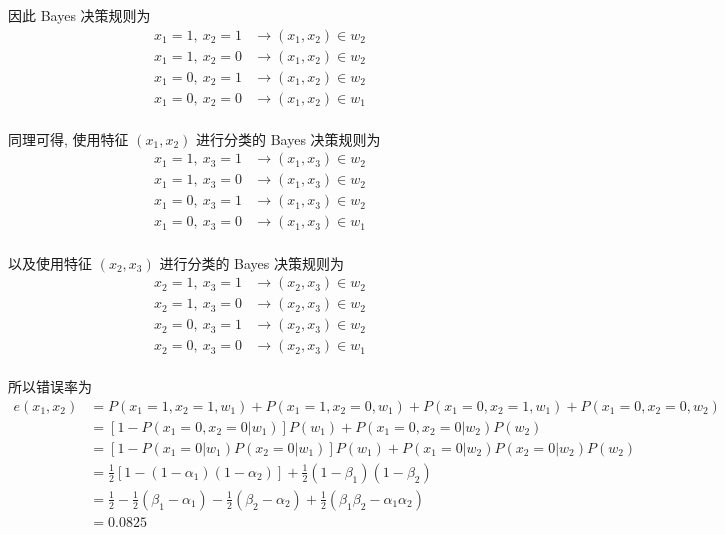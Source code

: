 \documentclass{article}
\begin{document}
因此 Bayes 决策规则为
\begin{equation}
  \begin{aligned}
    x_1=1,~x_2=1&\to (x_1,x_2)\in w_2\\
    x_1=1,~x_2=0&\to (x_1,x_2)\in w_2\\
    x_1=0,~x_2=1&\to (x_1,x_2)\in w_2\\
    x_1=0,~x_2=0&\to (x_1,x_2)\in w_1\\
  \end{aligned}
\end{equation}

同理可得, 使用特征 $(x_1,x_2)$ 进行分类的 Bayes 决策规则为
\begin{equation}
  \begin{aligned}
    x_1=1,~x_3=1&\to (x_1,x_3)\in w_2\\
    x_1=1,~x_3=0&\to (x_1,x_3)\in w_2\\
    x_1=0,~x_3=1&\to (x_1,x_3)\in w_2\\
    x_1=0,~x_3=0&\to (x_1,x_3)\in w_1\\
  \end{aligned}
\end{equation}

以及使用特征 $(x_2,x_3)$ 进行分类的 Bayes 决策规则为
\begin{equation}
  \begin{aligned}
    x_2=1,~x_3=1&\to (x_2,x_3)\in w_2\\
    x_2=1,~x_3=0&\to (x_2,x_3)\in w_2\\
    x_2=0,~x_3=1&\to (x_2,x_3)\in w_2\\
    x_2=0,~x_3=0&\to (x_2,x_3)\in w_1\\
  \end{aligned}
\end{equation}

所以错误率为
\begin{equation}
  \begin{aligned}
    e(x_1,x_2)
    &=P(x_1=1,x_2=1,w_1)+P(x_1=1,x_2=0,w_1)+P(x_1=0,x_2=1,w_1)+P(x_1=0,x_2=0,w_2)\\
    &=[1-P(x_1=0,x_2=0|w_1)]P(w_1)+P(x_1=0,x_2=0|w_2)P(w_2)\\
    &=[1-P(x_1=0|w_1)P(x_2=0|w_1)]P(w_1)+P(x_1=0|w_2)P(x_2=0|w_2)P(w_2)\\
    &=\frac{1}{2}[1-(1-\alpha_1)(1-\alpha_2)]+\frac{1}{2}(1-\beta_1)(1-\beta_2)\\
    &=\frac{1}{2}-\frac{1}{2}(\beta_1-\alpha_1)-\frac{1}{2}(\beta_2-\alpha_2)+\frac{1}{2}(\beta_1\beta_2-\alpha_1\alpha_2)\\
    &=0.0825
  \end{aligned}
\end{equation}
\end{document}
